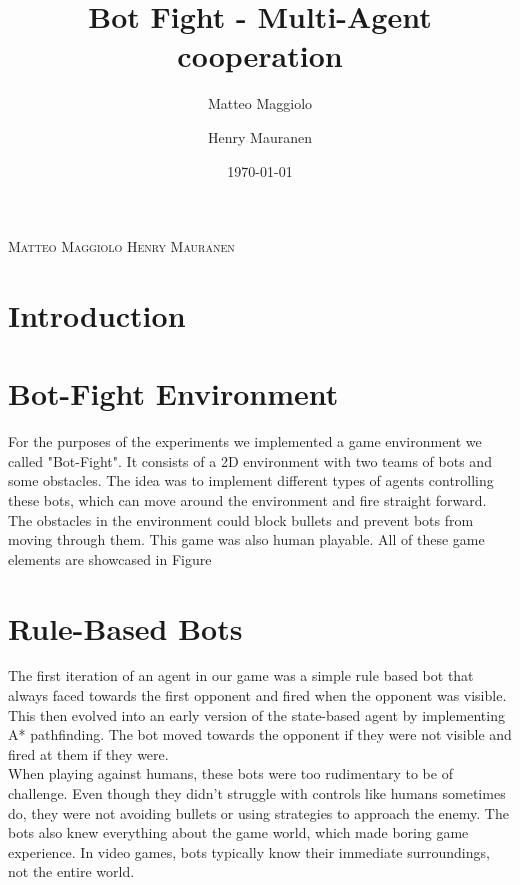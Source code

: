 \documentclass{article}
\title{Bot Fight - Multi-Agent cooperation}
\author{Matteo Maggiolo \and Henry Mauranen}
\date{\today}
\begin{document}
	
	\makeatletter
	\begin{center}
		{\scshape\LARGE{\@title}\par}
		{\scshape\normalsize Matteo Maggiolo \hspace{2cm} Henry Mauranen \par}
		{\scshape\normalsize\@date\par}
	\end{center}
	\makeatother
	
	\section{Introduction}
	
	
	
	\section{Bot-Fight Environment}
	For the purposes of the experiments we implemented a game environment we called "Bot-Fight". It consists of a 2D environment with two teams of bots and some obstacles. The idea was to implement different types of agents controlling these bots, which can move around the environment and fire straight forward. The obstacles in the environment could block bullets and prevent bots from moving through them. This game was also human playable. All of these game elements are showcased in Figure 
	
	
	\section{Rule-Based Bots}
	
	The first iteration of an agent in our game was a simple rule based bot that always faced towards the first opponent and fired when the opponent was visible. This then evolved into an early version of the state-based agent by implementing A* pathfinding. The bot moved towards the opponent if they were not visible and fired at them if they were. \\
	When playing against humans, these bots were too rudimentary to be of challenge. Even though they didn't struggle with controls like humans sometimes do, they were not avoiding bullets or using strategies to approach the enemy. The bots also knew everything about the game world, which made boring game experience. In video games, bots typically know their immediate surroundings, not the entire world.
	
\end{document}

